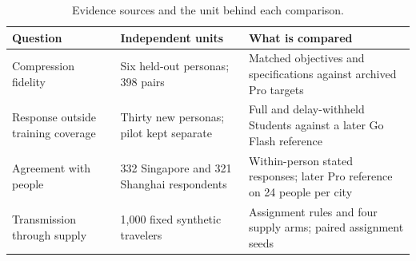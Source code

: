 \begin{table}[pos=htbp]
\caption{Evidence sources and the unit behind each comparison.}\label{tab:study_design}
\small\renewcommand{\arraystretch}{1.15}
\begin{tabularx}{\linewidth}{@{}p{.23\linewidth}p{.28\linewidth}X@{}}\toprule
Question & Independent units & What is compared \\\midrule
Compression fidelity & Six held-out personas; 398 pairs & Matched objectives and specifications against archived Pro targets \\
Response outside training coverage & Thirty new personas; pilot kept separate & Full and delay-withheld Students against a later Go Flash reference \\
Agreement with people & 332 Singapore and 321 Shanghai respondents & Within-person stated responses; later Pro reference on 24 people per city \\
Transmission through supply & 1,000 fixed synthetic travelers & Assignment rules and four supply arms; paired assignment seeds \\\bottomrule
\end{tabularx}
\end{table}
